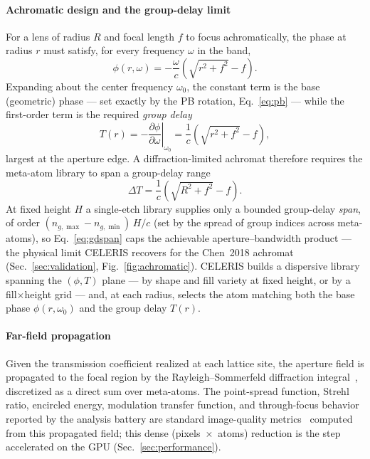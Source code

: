 \documentclass[preprint,12pt]{elsarticle}
\begin{document}
\paragraph{Achromatic design and the group-delay limit}
For a lens of radius $R$ and focal length $f$ to focus achromatically, the phase
at radius $r$ must satisfy, for every frequency $\omega$ in the band,
\begin{equation}
\phi(r,\omega) = -\frac{\omega}{c}\left(\sqrt{r^2+f^2}-f\right).
\end{equation}
Expanding about the center frequency $\omega_0$, the constant term is the base
(geometric) phase --- set exactly by the PB rotation, Eq.~\eqref{eq:pb} --- while
the first-order term is the required \emph{group delay}
\begin{equation}
T(r) = -\left.\frac{\partial\phi}{\partial\omega}\right|_{\omega_0}
     = \frac{1}{c}\left(\sqrt{r^2+f^2}-f\right),
\end{equation}
largest at the aperture edge. A diffraction-limited achromat therefore requires
the meta-atom library to span a group-delay range
\begin{equation}
\Delta T = \frac{1}{c}\left(\sqrt{R^2+f^2}-f\right).
\label{eq:gdspan}
\end{equation}
At fixed height $H$ a single-etch library supplies only a bounded group-delay
\emph{span}, of order $(n_{g,\max}-n_{g,\min})\,H/c$ (set by the spread of group indices
across meta-atoms), so Eq.~\eqref{eq:gdspan} caps the achievable aperture--bandwidth
product --- the physical limit CELERIS recovers for the Chen~2018 achromat
(Sec.~\ref{sec:validation}, Fig.~\ref{fig:achromatic}).
CELERIS builds a dispersive library spanning the $(\phi,T)$ plane --- by shape and
fill variety at fixed height, or by a fill$\times$height grid --- and, at each
radius, selects the atom matching both the base phase $\phi(r,\omega_0)$ and the
group delay $T(r)$.

\paragraph{Far-field propagation}
Given the transmission coefficient realized at each lattice site, the aperture
field is propagated to the focal region by the Rayleigh--Sommerfeld diffraction
integral~\cite{goodman}, discretized as a direct sum over meta-atoms. The
point-spread function, Strehl ratio, encircled energy, modulation transfer function,
and through-focus behavior reported by the analysis battery are standard
image-quality metrics~\cite{bornwolf} computed from this propagated field;
this dense (pixels~$\times$~atoms) reduction is the step accelerated on the GPU
(Sec.~\ref{sec:performance}).
\end{document}
